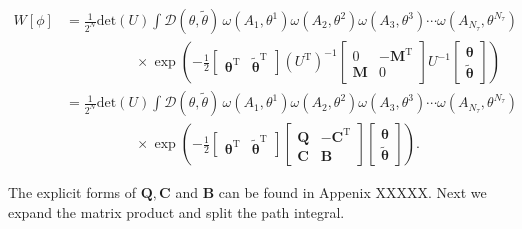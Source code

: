 \documentclass{article}
\begin{document}
\begin{align}
	W\left[ \phi \right] &= \frac{1}{2^N} \mathrm{det} \left(U\right) 
	\int \mathcal{D}\left({\theta},\tilde{\theta}\right)\,
	\omega\!\left(A_1, \theta^1\right)
	\omega\!\left(A_2, \theta^2\right)
	\omega\!\left(A_3, \theta^3\right)
	\cdots
	\omega\!\left(A_{N_\tau}, \theta^{N_\tau}\right) \nonumber \\
	&\quad \quad \quad \quad \quad \times \exp\left(
	-\frac{1}{2}
	\begin{bmatrix}
		\boldsymbol{\theta}^{\mathrm T} & \boldsymbol{\tilde{\theta}}^{\mathrm T}
	\end{bmatrix}\left(U^\mathrm{T}  \right)^{-1}
	\begin{bmatrix}
		0 & -\boldsymbol{M}^\mathrm{T}   \\ \boldsymbol{M} & 0
	\end{bmatrix}U^{-1}
	\begin{bmatrix}
		\boldsymbol{\theta} \\ \boldsymbol{\tilde{\theta}}
	\end{bmatrix}
	\right) \\
	&= \frac{1}{2^N}\mathrm{det} \left(U\right) 
	\int \mathcal{D}\left({\theta},\tilde{\theta}\right)\,
	\omega\!\left(A_1, \theta^1\right)
	\omega\!\left(A_2, \theta^2\right)
	\omega\!\left(A_3, \theta^3\right)
	\cdots
	\omega\!\left(A_{N_\tau}, \theta^{N_\tau}\right) \nonumber \\
	&\quad \quad \quad \quad \quad \times \exp\left(
	-\frac{1}{2}
	\begin{bmatrix}
		\boldsymbol{\theta}^{\mathrm T} & \boldsymbol{\tilde{\theta}}^{\mathrm T}
	\end{bmatrix}
	\begin{bmatrix}
		\boldsymbol{Q} & -\boldsymbol{C}^\mathrm{T}   \\ \boldsymbol{C} & \boldsymbol{B}
	\end{bmatrix}
	\begin{bmatrix}
		\boldsymbol{\theta} \\ \boldsymbol{\tilde{\theta}}
	\end{bmatrix}
	\right).
\end{align}

The explicit forms of $\boldsymbol{Q}, \boldsymbol{C}$ and $ \boldsymbol{B}$ can be found in Appenix XXXXX. Next we expand the matrix product and split the path integral.
\end{document}
